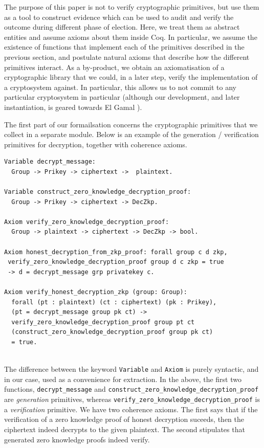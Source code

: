 \documentclass{llncs}
\begin{document}
The purpose of this paper is not to verify cryptographic primitives, 
but use them as a tool to construct evidence which can be used 
to audit and verify the outcome during different phase 
of election. Here, we treat them as abstract entities and assume
axioms about them inside Coq.
In particular, we assume the existence of functions that implement
each of the primitives described in the previous section, and
postulate natural axioms that describe how the different primitives
interact. As a by-product, we obtain an axiomatisation of a
cryptographic library that we could, in a later step, verify the
implementation of a cryptosystem against.  In particular, this
allows us to not commit to any particular cryptosystem in particular
(although our development, and later instantiation, is geared
towards El Gamal \cite{DBLP:conf/crypto/Gamal84}).

The first part of our formailsation concerns the cryptographic
primitives that we collect in a separate module. Below is an example
of the generation / verification primitives for decryption, together
with coherence axioms.
\begin{lstlisting}[frame=single,basicstyle=\ttfamily\footnotesize]
Variable decrypt_message: 
  Group -> Prikey -> ciphertext ->  plaintext.

Variable construct_zero_knowledge_decryption_proof:
  Group -> Prikey -> ciphertext -> DecZkp.

Axiom verify_zero_knowledge_decryption_proof:
  Group -> plaintext -> ciphertext -> DecZkp -> bool.

Axiom honest_decryption_from_zkp_proof: forall group c d zkp, 
 verify_zero_knowledge_decryption_proof group d c zkp = true 
 -> d = decrypt_message grp privatekey c.
 
Axiom verify_honest_decryption_zkp (group: Group):
  forall (pt : plaintext) (ct : ciphertext) (pk : Prikey),
  (pt = decrypt_message group pk ct) ->
  verify_zero_knowledge_decryption_proof group pt ct 
  (construct_zero_knowledge_decryption_proof group pk ct) 
  = true.
  

\end{lstlisting}
  
\noindent
The difference between the keyword \texttt{Variable} and \texttt{Axiom}
is purely syntactic, and in our case, used as a convenience for 
extraction. In
the above, the first two functions, \texttt{decrypt\_message} and
\texttt{construct\_zero\_knowledge\_decryption\_proof} are
\emph{generation} primitives, whereas 
\texttt{verify\_zero\_knowledge\_decryption\_proof} is a
\emph{verification} primitive. We have two coherence axioms. The
first says that if the verification of a zero knowledge proof of
honest decryption suceeds, then the ciphertext indeed decrypts to
the given plaintext. The second stipulates that generated zero
knowledge proofs indeed verify. 
\end{document}
